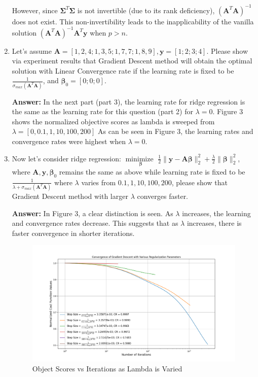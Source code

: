 \documentclass[11pt]{article}
\newcommand{\minimize}{\operatorname*{minimize\ }}
\newcommand{\mtx}[1]{\mathbf{#1}}
\newcommand{\vct}[1]{\mathbf{#1}}
\def \mA {\mtx{A}}
\def \vy {\vct{y}}
\begin{document}
\begin{enumerate}
		However, since \(\mathbf{\Sigma}^T \mathbf{\Sigma}\) is not invertible (due to its rank deficiency), \((\mathbf{A}^T \mathbf{A})^{-1}\) does not exist. This non-invertibility leads to the inapplicability of the vanilla solution \((\mathbf{A}^T \mathbf{A})^{-1} \mathbf{A}^T \mathbf{y}\) when \(p > n\).
		
		\item Let's assume $\mA=[1, 2, 4;1, 3, 5; 1, 7, 7; 1, 8, 9], \vy=[1;2;3;4]$. Please show via experiment results that Gradient Descent method will obtain the optimal solution with  Linear Convergence rate if the learning rate is fixed to be $\frac{1}{\sigma_{max}(\mA^T\mA)}$, and $\bm{\beta}_0=[0;0;0]$.	
		
		\textbf{Answer:}
		In the next part (part 3), the learning rate for ridge regression is the same as the learning rate for this question (part 2) for $\lambda = 0$. Figure 3 shows the normalized objective scores as lambda is sweeped from 
		$\lambda = [0, 0.1, 1, 10, 100, 200]$
		As can be seen in Figure 3, the learning rates and convergence rates were highest when $\lambda = 0$.

		\item Now let's consider ridge regression: $\minimize \limits_{\bm{\beta}} \frac{1}{2}\|\vy-\mA\bm{\beta}\|^2_2+\frac{\lambda}{2} \|\bm{\beta}\|^2_2$, where  $\mA,\vy,\bm{\beta}_0$ remains the same as above while learning rate is fixed to be $\frac{1}{\lambda+\sigma_{max}(\mA^T\mA)}$ where $\lambda$ varies from $0.1,1,10,100,200$, please show that Gradient Descent method with larger $\lambda$ converges faster. 
		
		\textbf{Answer:}
		In Figure 3, a clear distinction is seen. As $\lambda$ increases, the learning and convergence rates decrease. This suggests that as $\lambda$ increases, there is faster convergence in shorter iterations. 

		\begin{figure}[htbp]
    		\centering
    		\includegraphics[width=\textwidth]{figures/hw3_2.png}
    		\caption{Object Scores vs Iterations as Lambda is Varied}
		\label{fig:objective_func_scores}
\end{figure}

	\end{enumerate}
\end{document}
